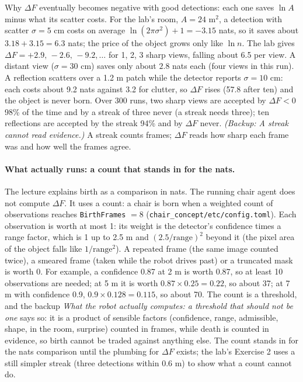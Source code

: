 \documentclass[11pt]{article}
\newcommand{\slt}[1]{\emph{#1}}   %
\begin{document}
Why $\Delta F$ eventually becomes negative with good detections: each one saves $\ln A$ minus what its scatter costs. For the lab's room, $A=24$ m$^2$, a detection with scatter $\sigma=5$ cm costs on average $\ln(2\pi\sigma^2)+1=-3.15$ nats, so it saves about $3.18+3.15=6.3$ nats; the price of the object grows only like $\ln n$. The lab gives $\Delta F=+2.9,\,-2.6,\,-9.2,\ldots$ for 1, 2, 3 sharp views, falling about 6.5 per view. A distant view ($\sigma=30$ cm) saves only about $2.8$ nats each (four views in this run). A reflection scatters over a 1.2 m patch while the detector reports $\sigma=10$ cm: each costs about 9.2 nats against 3.2 for clutter, so $\Delta F$ rises (57.8 after ten) and the object is never born. Over 300 runs, two sharp views are accepted by $\Delta F<0$ 98\% of the time and by a streak of three never (a streak needs three); ten reflections are accepted by the streak 94\% and by $\Delta F$ never. \slt{(Backup: A streak cannot read evidence.)} A streak counts frames; $\Delta F$ reads how sharp each frame was and how well the frames agree.

\paragraph{What actually runs: a count that stands in for the nats.} The lecture explains birth as a comparison in nats. The running chair agent does not compute $\Delta F$. It uses a count: a chair is born when a weighted count of observations reaches \texttt{BirthFrames} $=8$ (\texttt{chair\_concept/etc/config.toml}). Each observation is worth at most 1: its weight is the detector's confidence times a range factor, which is 1 up to 2.5 m and $(2.5/\text{range})^2$ beyond it (the pixel area of the object falls like $1/\text{range}^2$). A repeated frame (the same image counted twice), a smeared frame (taken while the robot drives past) or a truncated mask is worth 0. For example, a confidence 0.87 at 2 m is worth 0.87, so at least 10 observations are needed; at 5 m it is worth $0.87\times0.25=0.22$, so about 37; at 7 m with confidence 0.9, $0.9\times0.128=0.115$, so about 70. The count is a threshold, and the backup \slt{What the robot actually computes: a threshold that should not be one} says so: it is a product of sensible factors (confidence, range, admissible, shape, in the room, surprise) counted in frames, while death is counted in evidence, so birth cannot be traded against anything else. The count stands in for the nats comparison until the plumbing for $\Delta F$ exists; the lab's Exercise 2 uses a still simpler streak (three detections within 0.6 m) to show what a count cannot do.
\end{document}

